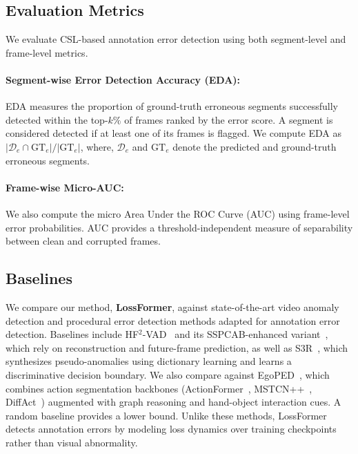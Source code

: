 \documentclass{article}
\theoremstyle{plain}
\theoremstyle{definition}
\theoremstyle{remark}
\begin{document}
\subsection{Evaluation Metrics}
\label{subsec:metrics}
We evaluate CSL-based annotation error detection using both segment-level and frame-level metrics.
\vspace{-0.8em}
\paragraph{Segment-wise Error Detection Accuracy (EDA):}
EDA measures the proportion of ground-truth erroneous segments successfully detected within the top-$k\%$ of frames ranked by the error score. A segment is considered detected if at least one of its frames is flagged.  We compute EDA as \( |\mathcal{D}_e \cap \text{GT}_e| / |\text{GT}_e| \), where, $\mathcal{D}_e$ and $\text{GT}_e$ denote the predicted and ground-truth erroneous segments.
\vspace{-0.6em}
\paragraph{Frame-wise Micro-AUC:}
We also compute the micro Area Under the ROC Curve (AUC) using frame-level error probabilities. AUC provides a threshold-independent measure of separability between clean and corrupted frames.

\vspace{-0.4em}
\subsection{Baselines}
\label{subsec:baselines}
We compare our method, \textbf{LossFormer}, against state-of-the-art video anomaly detection and procedural error detection methods adapted for annotation error detection. Baselines include HF$^2$-VAD~\cite{hf2vad} and its SSPCAB-enhanced variant~\cite{sspcab}, which rely on reconstruction and future-frame prediction, as well as S3R~\cite{s3r}, which synthesizes pseudo-anomalies using dictionary learning and learns a discriminative decision boundary. We also compare against EgoPED~\cite{EgoPER}, which combines action segmentation backbones (ActionFormer~\cite{ActionFormer}, MSTCN++~\cite{mstcn++}, DiffAct~\cite{diffact}) augmented with graph reasoning and hand-object interaction cues. A random baseline provides a lower bound. Unlike these methods, LossFormer detects annotation errors by modeling loss dynamics over training checkpoints rather than visual abnormality.
\end{document}
